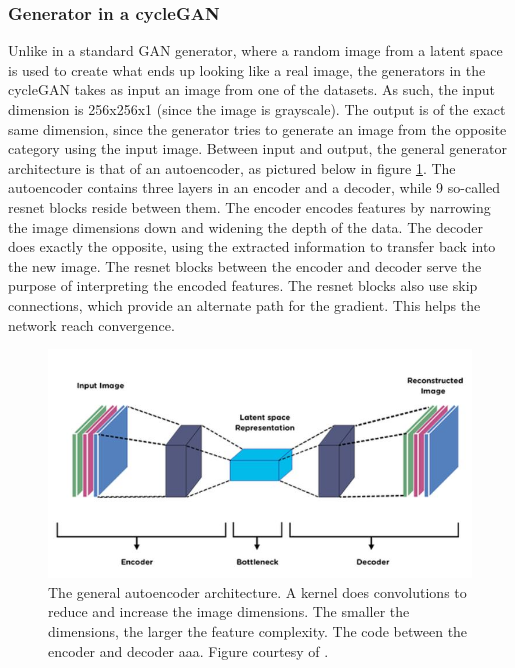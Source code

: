 \documentclass[12pt, fleqn, titlepage]{article}
\begin{document}
\subsubsection{Generator in a cycleGAN}
Unlike in a standard GAN generator, where a random image from a latent space is used to create what ends up looking like a real image, the generators in the cycleGAN takes as input an image from one of the datasets. As such, the input dimension is 256x256x1 (since the image is grayscale). The output is of the exact same dimension, since the generator tries to generate an image from the opposite category using the input image. Between input and output, the general generator architecture is that of an autoencoder, as pictured below in figure \ref{fig:autoencoder}. The autoencoder contains three layers in an encoder and a decoder, while 9 so-called resnet blocks reside between them. The encoder encodes features by narrowing the image dimensions down and widening the depth of the data. The decoder does exactly the opposite, using the extracted information to transfer back into the new image. The resnet blocks between the encoder and decoder serve the purpose of interpreting the encoded features. The resnet blocks also use skip connections, which provide an alternate path for the gradient. This helps the network reach convergence.

\begin{figure}[H]
	\centering
	\includegraphics[width=0.7\linewidth]{imgs/autoencoder}
	\caption{The general autoencoder architecture. A kernel does convolutions to reduce and increase the image dimensions. The smaller the dimensions, the larger the feature complexity. The code between the encoder and decoder aaa. Figure courtesy of \cite{autoencoder}.} %
	\label{fig:autoencoder}
\end{figure}
\end{document}
